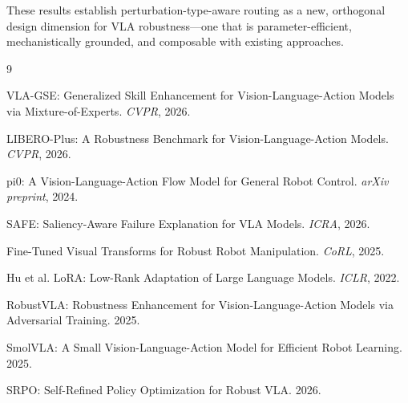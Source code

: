 \documentclass[letterpaper]{article}
\begin{document}
These results establish perturbation-type-aware routing as a new, orthogonal design dimension for VLA robustness---one that is parameter-efficient, mechanistically grounded, and composable with existing approaches.



\begin{thebibliography}{9}

VLA-GSE: Generalized Skill Enhancement for Vision-Language-Action Models via Mixture-of-Experts.
\textit{CVPR}, 2026.

LIBERO-Plus: A Robustness Benchmark for Vision-Language-Action Models.
\textit{CVPR}, 2026.

pi0: A Vision-Language-Action Flow Model for General Robot Control.
\textit{arXiv preprint}, 2024.

SAFE: Saliency-Aware Failure Explanation for VLA Models.
\textit{ICRA}, 2026.

Fine-Tuned Visual Transforms for Robust Robot Manipulation.
\textit{CoRL}, 2025.

Hu et al. LoRA: Low-Rank Adaptation of Large Language Models.
\textit{ICLR}, 2022.

RobustVLA: Robustness Enhancement for Vision-Language-Action Models via Adversarial Training.
2025.

SmolVLA: A Small Vision-Language-Action Model for Efficient Robot Learning.
2025.

SRPO: Self-Refined Policy Optimization for Robust VLA.
2026.

\end{thebibliography}
\end{document}
